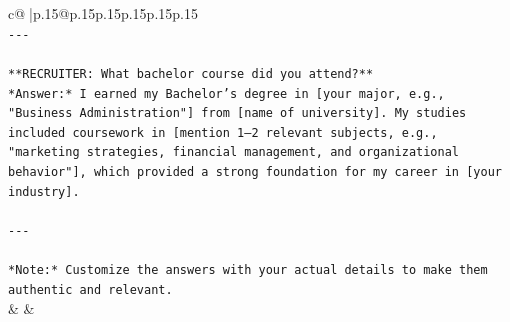 \documentclass{article}
\begin{document}
{\begin{supertabular}{c@{$\;$}|p{.15\linewidth}@{}p{.15\linewidth}p{.15\linewidth}p{.15\linewidth}p{.15\linewidth}p{.15\linewidth}}
{{{\\ 
\texttt{{-}{-}{-}} \\
\\ 
\texttt{**RECRUITER: What bachelor course did you attend?**  } \\
\texttt{*Answer:* I earned my Bachelor’s degree in {[}your major, e.g., "Business Administration"{]} from {[}name of university{]}. My studies included coursework in {[}mention 1–2 relevant subjects, e.g., "marketing strategies, financial management, and organizational behavior"{]}, which provided a strong foundation for my career in {[}your industry{]}.} \\
\\ 
\texttt{{-}{-}{-}} \\
\\ 
\texttt{*Note:* Customize the answers with your actual details to make them authentic and relevant.} \\
            }
        }
    }
    & & \\ \\


\end{supertabular}}
\end{document}
